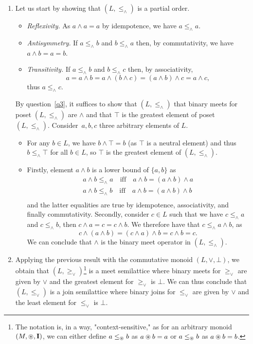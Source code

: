 \documentclass[fontsize=16pt,a4paper,DIV=17,parskip=half]{scrartcl}
\theoremstyle{definition}
\begin{document}
  \begin{enumerate}
    \item Let us start by showing that $(L, \le_\wedge)$ is a partial order.
      \begin{itemize}
        \item \textit{Reflexivity.} As $a \wedge a = a$ by idempotence, we have $a \le_\wedge a$.
        \item \textit{Antisymmetry.} If $a \le_\wedge b$ and $b \le_\wedge a$ then, by commutativity, we have $a \wedge b = a = b$.
        \item \textit{Transitivity.} If $a \le_\wedge b$ and $b \le_\wedge c$ then, by associativity,
          \[
          a = a \wedge b = a \wedge (b \wedge c) = (a \wedge b) \wedge c = a \wedge c
          ,\] 
          thus $a \le_\wedge c$.
      \end{itemize}
      By question~\ref{q3}, it suffices to show that $(L, \le_\wedge)$ that binary meets for poset $(L, \le_\wedge)$ are $\wedge$ and that $\top$ is the greatest element of poset $(L, \le_\wedge)$.
      Consider~$a, b, c$ three arbitrary elements of $L$.
      \begin{itemize}
        \item For any $b \in L$, we have $b \wedge \top = b$ (as $\top$ is a neutral element) and thus $b \le_\wedge \top$ for all $b \in L$, so $\top$ is the greatest element of $(L, \le_\wedge)$.
        \item Firstly, element $a \wedge b$ is a lower bound of $\{a,b\}$ as 
          \begin{gather*}
            a \wedge b \le_\wedge a \quad\text{iff}\quad a \wedge b = (a \wedge b) \wedge a\\
            a \wedge b \le_\wedge b \quad\text{iff}\quad a \wedge b = (a \wedge b) \wedge b\\
          \end{gather*}
          and the latter equalities are true by idempotence, associativity, and finally commutativity.
          Secondly, consider $c \in L$ such that we have $c \le_\wedge a$ and $c \le_\wedge b$, then $c \wedge a = c = c \wedge b$.
          We therefore have that $c \le_\wedge a \wedge b$, as
          \[
          c \wedge (a \wedge b) = (c \wedge a) \wedge b = c \wedge b = c
          .\] 
          We can conclude that $\wedge$ is the binary meet operator in  $(L, \le_\wedge)$.
      \end{itemize}
    \item Applying the previous result with the commutative monoid $(L, \vee, \bot)$, we obtain that $(L, \ge_\vee)$\footnote{The notation is, in a way, "context-sensitive," as for an arbitrary monoid $(M, \oast, \mathbf{I})$, we can either define $a \le_\oast b$ as $a \oast b = a$ or $a \le_\oast b$ as $a \oast b = b$.} is a meet semilattice where binary meets for $\ge_\vee$ are given by $\vee$ and the greatest element for $\ge_\vee$ is $\bot$.
      We can thus conclude that $(L, \le_\vee)$ is a join semilattice where binary joins for $\le_\vee$ are given by $\vee$ and the least element for $\le_\vee$ is $\bot$.
  \end{enumerate}
\end{document}
